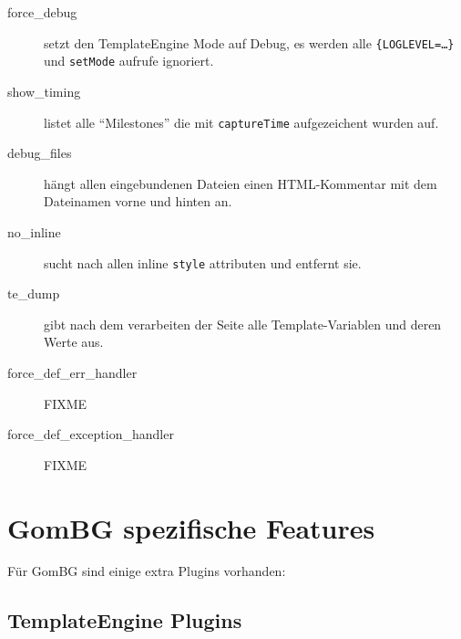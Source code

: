 \documentclass[a4paper,10pt]{article}
\begin{document}
\begin{description}
  \item[force\_debug] setzt den TemplateEngine Mode auf Debug, es werden alle {\tt \{LOGLEVEL=\dots \}} und {\tt setMode} aufrufe ignoriert.
  \item[show\_timing] listet alle "`Milestones"' die mit {\tt captureTime} aufgezeichent wurden auf.
  \item[debug\_files] h\"angt allen eingebundenen Dateien einen HTML-Kommentar mit dem Dateinamen vorne und hinten an.
  \item[no\_inline] sucht nach allen inline {\tt style} attributen und entfernt sie.
  \item[te\_dump] gibt nach dem verarbeiten der Seite alle Template-Variablen und deren Werte aus.
  \item[force\_def\_err\_handler] FIXME
  \item[force\_def\_exception\_handler] FIXME
\end{description}



\section{GomBG spezifische Features}
F\"ur GomBG sind einige extra Plugins vorhanden:

\subsection{TemplateEngine Plugins}
\end{document}
